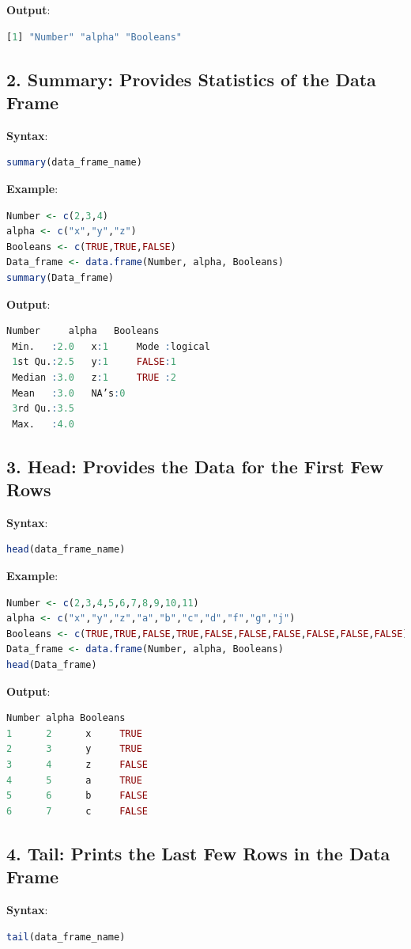 \documentclass[10pt]{book}
\begin{document}
\textbf{Output}:
\begin{lstlisting}[language=R]
[1] "Number" "alpha" "Booleans"
\end{lstlisting}

\subsection*{2. Summary: Provides Statistics of the Data Frame}
\textbf{Syntax}:
\begin{lstlisting}[language=R]
summary(data_frame_name)
\end{lstlisting}

\textbf{Example}:
\begin{lstlisting}[language=R]
Number <- c(2,3,4)
alpha <- c("x","y","z")
Booleans <- c(TRUE,TRUE,FALSE)
Data_frame <- data.frame(Number, alpha, Booleans)
summary(Data_frame)
\end{lstlisting}

\textbf{Output}:
\begin{lstlisting}[language=R]
     Number     alpha   Booleans
 Min.   :2.0   x:1     Mode :logical
 1st Qu.:2.5   y:1     FALSE:1
 Median :3.0   z:1     TRUE :2
 Mean   :3.0   NA’s:0
 3rd Qu.:3.5
 Max.   :4.0
\end{lstlisting}

\subsection*{3. Head: Provides the Data for the First Few Rows}
\textbf{Syntax}:
\begin{lstlisting}[language=R]
head(data_frame_name)
\end{lstlisting}

\textbf{Example}:
\begin{lstlisting}[language=R]
Number <- c(2,3,4,5,6,7,8,9,10,11)
alpha <- c("x","y","z","a","b","c","d","f","g","j")
Booleans <- c(TRUE,TRUE,FALSE,TRUE,FALSE,FALSE,FALSE,FALSE,FALSE,FALSE)
Data_frame <- data.frame(Number, alpha, Booleans)
head(Data_frame)
\end{lstlisting}

\textbf{Output}:
\begin{lstlisting}[language=R]
Number alpha Booleans
1      2      x     TRUE
2      3      y     TRUE
3      4      z     FALSE
4      5      a     TRUE
5      6      b     FALSE
6      7      c     FALSE
\end{lstlisting}

\subsection*{4. Tail: Prints the Last Few Rows in the Data Frame}
\textbf{Syntax}:
\begin{lstlisting}[language=R]
tail(data_frame_name)
\end{lstlisting}
\end{document}
